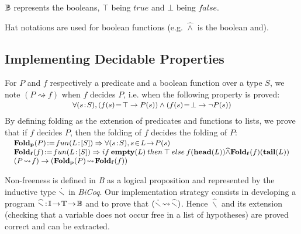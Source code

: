 \documentclass{llncs}
\begin{document}
\begin{notation}\small$\mathbb{B}$ represents the booleans, $\top$ being $true$ and $\bot$ being 
$false$.
\end{notation}

\begin{notation}\small Hat notations are used for boolean functions (e.g. $\widehat{\land}$ 
is the boolean and).
\end{notation}

\subsection{Implementing Decidable Properties}\label{ss_implem}

For $P$ and $f$ respectively a predicate and a boolean function over a type $S$, we note
$(P\!\rightsquigarrow\!f)$ when $f$ decides $P$, i.e. when the following property is proved:
\[
\small
\begin{array}{l}
\vspace{-16pt}\\
\forall(s\!:\!S), (f(s)\!=\!\top \to P(s)) \land (f(s)\!=\!\bot \to \lnot P(s))
\end{array}
\]
By defining folding as the extension of predicates and functions to lists, we prove that if 
$f$ decides $P$, then the folding of $f$  decides the folding of $P$:
\[
\small
\begin{array}{l}
\vspace{-16pt}\\
\Bcmd{Fold_p}(P)\!:=\!fun (L\!:\![S]) \Rightarrow \forall (s\!:\!S), s\!\in\!L\!\to\!P(s)\\
\Bcmd{Fold_f}(f)\!:=\!fun (L\!:\![S]) \Rightarrow
if\:\Bcmd{empty}(L)\:then\:\top\:else\:
f(\Bcmd{head}(L)) \widehat{\land} \Bcmd{Fold_f}(f)(\Bcmd{tail}(L))\\
(P\!\rightsquigarrow\!f) \to (\Bcmd{Fold_p}(P)\!\rightsquigarrow\!\Bcmd{Fold_f}(f))
\end{array}
\]

\begin{example}\small Non-freeness is defined in \emph{B} as a logical 
proposition and represented by the inductive type $\dot{\smallsetminus}$ in \emph{BiCoq}. Our 
implementation strategy consists in developing a program 
$\widehat{\smallsetminus}\!:\!\mathbb{I}\!\to\!\mathbb{T}\!\to\!\mathbb{B}$ and to prove that 
$(\dot{\smallsetminus}\!\rightsquigarrow\!\widehat{\smallsetminus})$. Hence $\widehat{\smallsetminus}$ 
and its extension (checking that a variable does not occur free in a list of hypotheses) are 
proved correct and can be extracted.
\end{example}
\end{document}
